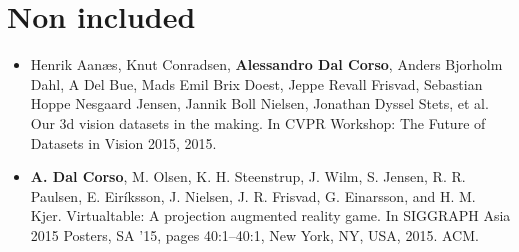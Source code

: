\section*{Non included}
\begin{itemize}
\item Henrik Aanæs, Knut Conradsen, \textbf{Alessandro Dal Corso}, Anders Bjorholm Dahl, A Del Bue, Mads Emil Brix Doest, Jeppe Revall Frisvad, Sebastian Hoppe Nesgaard Jensen, Jannik Boll Nielsen, Jonathan Dyssel Stets, et al. Our 3d vision datasets in the making. In CVPR Workshop: The Future of Datasets in Vision 2015, 2015.~\cite{aanaes2015our}
\item \textbf{A. Dal Corso}, M. Olsen, K. H. Steenstrup, J. Wilm, S. Jensen, R. R. Paulsen, E. Eiríksson, J. Nielsen, J. R. Frisvad, G. Einarsson, and H. M. Kjer. Virtualtable: A projection augmented reality game. In SIGGRAPH Asia 2015 Posters, SA ’15, pages 40:1–40:1, New York, NY, USA, 2015. ACM.~\cite{dalcorsosig15}
\end{itemize}


